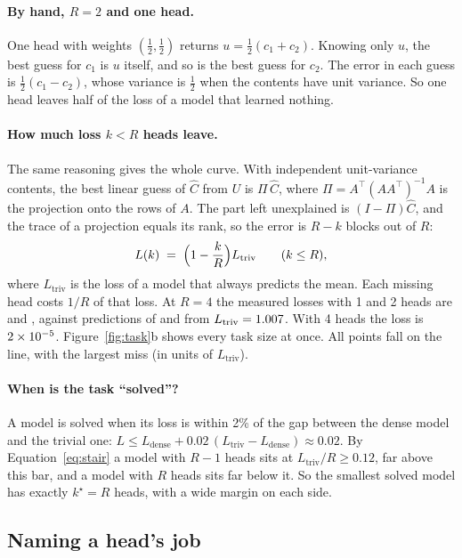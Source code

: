 \documentclass[11pt]{report}
\newcommand{\kstar}{k^\star}
\newcommand{\Ltriv}{L_{\mathrm{triv}}}
\begin{document}
\paragraph{By hand, $R = 2$ and one head.} One head with weights $(\tfrac12, \tfrac12)$
returns $u = \tfrac12(c_1 + c_2)$. Knowing only $u$, the best guess for $c_1$ is $u$
itself, and so is the best guess for $c_2$. The error in each guess is
$\tfrac12(c_1 - c_2)$, whose variance is $\tfrac12$ when the contents have unit variance.
So one head leaves half of the loss of a model that learned nothing.

\paragraph{How much loss $k < R$ heads leave.} The same reasoning gives the whole curve.
With independent unit-variance contents, the best linear guess of $\widehat C$ from $U$ is
$\Pi\,\widehat C$, where $\Pi = A^\top (A A^\top)^{-1} A$ is the projection onto the rows
of $A$. The part left unexplained is $(I - \Pi)\widehat C$, and the trace of a projection
equals its rank, so the error is $R - k$ blocks out of $R$:
\begin{equation}
  L(k) \;=\; \Bigl(1 - \frac{k}{R}\Bigr) \Ltriv \qquad (k \le R),
  \label{eq:stair}
\end{equation}
where $\Ltriv$ is the loss of a model that always predicts the mean. Each missing head
costs $1/R$ of that loss. At $R = 4$ the measured losses with 1 and 2 heads are
\thLossOne{} and \thLossTwo{}, against predictions of \thPredOne{} and \thPredTwo{} from
$\Ltriv = \thTriv$. With 4 heads the loss is $2 \times 10^{-5}$. Figure~\ref{fig:task}b shows
every task size at once. All points fall on the line, with the largest miss
\thStairMaxErr{} (in units of $\Ltriv$).

\paragraph{When is the task ``solved''?} A model is solved when its loss is within 2\% of
the gap between the dense model and the trivial one:
$L \le L_{\mathrm{dense}} + 0.02\,(\Ltriv - L_{\mathrm{dense}}) \approx 0.02$. By
Equation~\eqref{eq:stair} a model with $R - 1$ heads sits at $\Ltriv / R \ge 0.12$, far
above this bar, and a model with $R$ heads sits far below it. So the smallest solved model
has exactly $\kstar = R$ heads, with a wide margin on each side.

\subsection{Naming a head's job}
\end{document}
